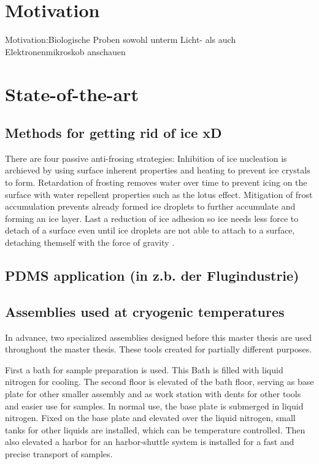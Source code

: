 
\section{Motivation}
Motivation:Biologische Proben sowohl unterm Licht- als auch Elektronenmikroskob anschauen

\section{State-of-the-art}

\subsection{Methods for getting rid of ice xD}

There are four passive anti-frosing strategies: Inhibition of ice nucleation is archieved by using surface inherent properties and heating to prevent ice crystals to form. Retardation of frosting removes water over time to prevent icing on the surface with water repellent properties such as the lotus effect. Mitigation of frost accumulation prevents already formed ice droplets to further accumulate and forming an ice layer. Last a reduction of ice adhesion so ice needs less force to detach of a surface even until ice droplets are not able to attach to a surface, detaching themself with the force of gravity \cite{Yang.2021}. 

\subsection{PDMS application (in z.b. der Flugindustrie)}

\subsection{Assemblies used at cryogenic temperatures}

In advance, two specialized assemblies designed before this master thesis are used throughout the master thesis. These tools created for partially different purposes.

First a bath for sample preparation is used. This Bath is filled with liquid nitrogen for cooling. The second floor is elevated of the bath floor, serving as base plate for other smaller assembly and as work station with dents for other tools and easier use for samples. In normal use, the base plate is submerged in liquid nitrogen. Fixed on the base plate and elevated over the liquid nitrogen, small tanks for other liquids are installed, which can be temperature controlled. Then also elevated a harbor for an harbor-shuttle system is installed for a fast and precise transport of samples.

